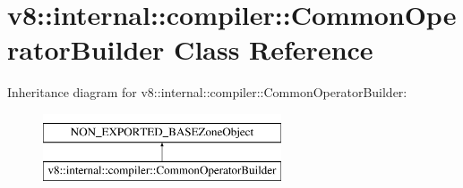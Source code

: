 \hypertarget{classv8_1_1internal_1_1compiler_1_1CommonOperatorBuilder}{}\section{v8\+:\+:internal\+:\+:compiler\+:\+:Common\+Operator\+Builder Class Reference}
\label{classv8_1_1internal_1_1compiler_1_1CommonOperatorBuilder}
Inheritance diagram for v8\+:\+:internal\+:\+:compiler\+:\+:Common\+Operator\+Builder\+:\begin{figure}[H]
\begin{center}
\leavevmode
\includegraphics[height=2.000000cm]{classv8_1_1internal_1_1compiler_1_1CommonOperatorBuilder}
\end{center}
\end{figure}
